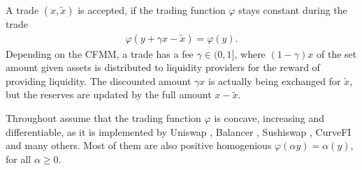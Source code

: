 A trade $(x, \tilde{x})$ is accepted, if the trading function $\varphi$
stays constant during the trade
\begin{align}
    \varphi(y+\gamma x - \tilde{x}) = \varphi(y).
\end{align}
Depending on the CFMM, a trade has a fee $\gamma \in (0, 1]$, where
$(1-\gamma)x$ of the set amount given assets is distributed to liquidity
providers for the reward of providing liquidity. The discounted amount
$\gamma x$ is actually being exchanged for $\tilde{x}$, but the reserves are
updated by the full amount $x - \tilde{x}$.

Throughout assume that the trading function $\varphi$ is concave,
increasing and differentiable, as it is implemented by Uniswap
\cite{uniswap}, Balancer \cite{balancer}, Sushiswap \cite{sushiswap}, CurveFI
\cite{curvefi} and many others. Most of them are also positive homogenious
$\varphi(\alpha y)=\alpha(y)$, for all $\alpha \ge 0$.

